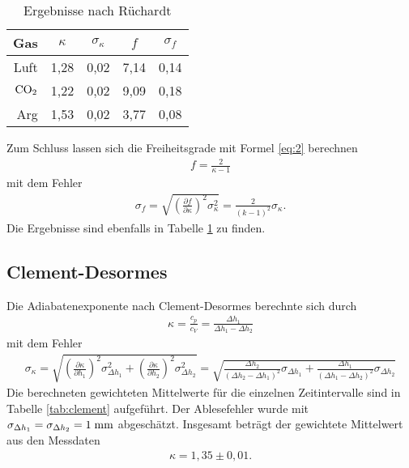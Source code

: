 \documentclass[12pt, a4paper, twoside]{scrartcl}
\begin{document}
\begin{table} [H]
\centering
\begin{tabular}{|r|c|c|c|c|} \hline
    Gas & $\kappa$ & $\sigma_\kappa$ & $f$ & $\sigma_f$ \\ \hline
    Luft & 1,28& 0,02 & 7,14 &  0,14\\
    $\rm{CO_2}$ & 1,22& 0,02 & 9,09 & 0,18 \\
    Arg & 1,53& 0,02 & 3,77 &  0,08 \\ \hline
 \end{tabular} 
 \caption{\label{tab:ruechardt}Ergebnisse nach Rüchardt}
\end{table}

Zum Schluss lassen sich die Freiheitsgrade mit Formel \ref{eq:2} berechnen
\begin{align*}
f=\frac{2}{\kappa-1}
\end{align*}
mit dem Fehler
\begin{align*}
\sigma_f=\sqrt{\left(\frac{\partial f}{\partial \kappa}\right)^2\sigma_\kappa^2}=\frac{2}{\left(k-1\right)^2}\sigma_\kappa.
\end{align*}
Die Ergebnisse sind ebenfalls in Tabelle \ref{tab:ruechardt} zu finden.




\subsection{Clement-Desormes}

Die Adiabatenexponente nach Clement-Desormes berechnte sich durch
\begin{align*}
\kappa=\frac{c_p}{c_V}=\frac{\Delta h_1}{\Delta h_1-\Delta h_2}
\end{align*}
mit dem Fehler
\begin{align*}
\sigma_\kappa=\sqrt{\left(\frac{\partial\kappa}{\partial h_1}\right)^2\sigma_{\Delta h_1}^2+\left(\frac{\partial\kappa}{\partial h_2}\right)^2\sigma_{\Delta h_2}^2}=\sqrt{\frac{\Delta h_2}{(\Delta h_2-\Delta h_1)^2}\sigma_{\Delta h_1}+\frac{\Delta h_1}{(\Delta h_1-\Delta h_2)^2}\sigma_{\Delta h_2}}
\end{align*}
Die berechneten gewichteten Mittelwerte für die einzelnen Zeitintervalle sind in Tabelle \ref{tab:clement} aufgeführt. Der Ablesefehler wurde mit $\sigma_{\Delta h_1}=\sigma_{\Delta h_2}=1\milli\meter$ abgeschätzt. Insgesamt beträgt der gewichtete Mittelwert aus den Messdaten
\begin{align*}
\kappa=1,35\pm0,01.
\end{align*}
\end{document}
